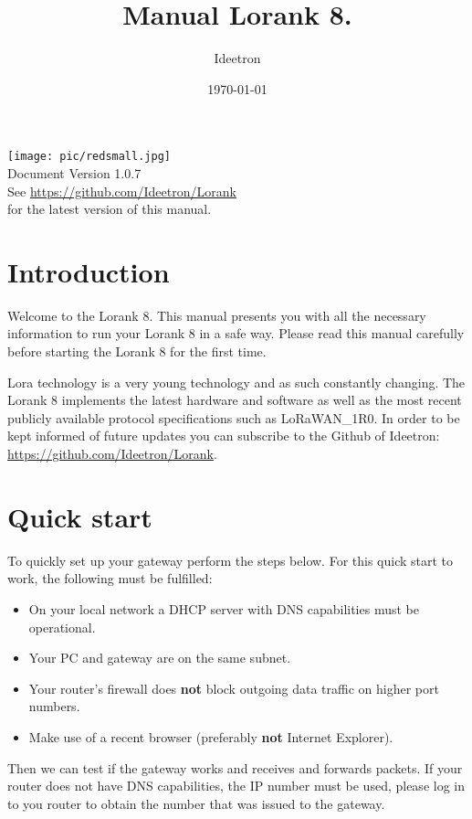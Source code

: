\documentclass[12pt]{article}
\title{Manual Lorank 8.}
\author{Ideetron}
\date{\today}
\begin{document}
\maketitle

\begin{center}
\texttt{[image: pic/redsmall.jpg]}\\
\larger[1] Document Version 1.0.7 \\
\smaller[1] See \url{https://github.com/Ideetron/Lorank} \\ for the latest version of this manual.
\end{center}


\newpage

\section{Introduction}
Welcome to the Lorank 8. This manual presents you with all the necessary 
information to run your Lorank 8 in a safe way. Please read this manual carefully 
before starting the Lorank 8 for the first time. 

Lora technology is a very young technology and as such constantly changing. 
The Lorank 8 implements the latest hardware and software as well 
as the most recent publicly available protocol specifications such
as LoRaWAN\_1R0. In order to be kept informed of future updates 
you can subscribe to the Github of Ideetron: \url{https://github.com/Ideetron/Lorank}.  

\section{Quick start}
To quickly set up your gateway perform the steps below. 
For this quick start to work, the following must be fulfilled:
\begin{itemize}
\item On your local network a DHCP server with DNS capabilities must be operational.
\item Your PC and gateway are on the same subnet.
\item Your router's firewall does {\bf not} block outgoing data traffic on higher port numbers.
\item Make use of a recent browser (preferably {\bf not} Internet Explorer).
\end{itemize}

Then we can test if the gateway works and receives and forwards packets.
If your router does not have DNS capabilities, the IP number must be used, please log
in to you router to obtain the number that was issued to the gateway.
\end{document}
